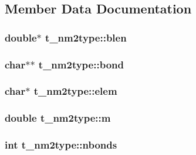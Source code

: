 \subsection{\-Member \-Data \-Documentation}
\hypertarget{structt__nm2type_afe6eb94d819cd56871d65cd6fc5ea77b}{
\subsubsection[{blen}]{\setlength{\rightskip}{0pt plus 5cm}double$\ast$ {\bf t\-\_\-nm2type\-::blen}}}\label{structt__nm2type_afe6eb94d819cd56871d65cd6fc5ea77b}
\hypertarget{structt__nm2type_a8720761af8e102ca3e8d17660edbc84e}{
\subsubsection[{bond}]{\setlength{\rightskip}{0pt plus 5cm}char$\ast$$\ast$ {\bf t\-\_\-nm2type\-::bond}}}\label{structt__nm2type_a8720761af8e102ca3e8d17660edbc84e}
\hypertarget{structt__nm2type_ae3a2ee355f7ff022bc37fe074f1bf301}{
\subsubsection[{elem}]{\setlength{\rightskip}{0pt plus 5cm}char$\ast$ {\bf t\-\_\-nm2type\-::elem}}}\label{structt__nm2type_ae3a2ee355f7ff022bc37fe074f1bf301}
\hypertarget{structt__nm2type_a0e2a333b2cf285d4811820aa28af2afa}{
\subsubsection[{m}]{\setlength{\rightskip}{0pt plus 5cm}double {\bf t\-\_\-nm2type\-::m}}}\label{structt__nm2type_a0e2a333b2cf285d4811820aa28af2afa}
\hypertarget{structt__nm2type_acabe54b31afbee39835937ef04d211de}{
\subsubsection[{nbonds}]{\setlength{\rightskip}{0pt plus 5cm}int {\bf t\-\_\-nm2type\-::nbonds}}}\label{structt__nm2type_acabe54b31afbee39835937ef04d211de}
